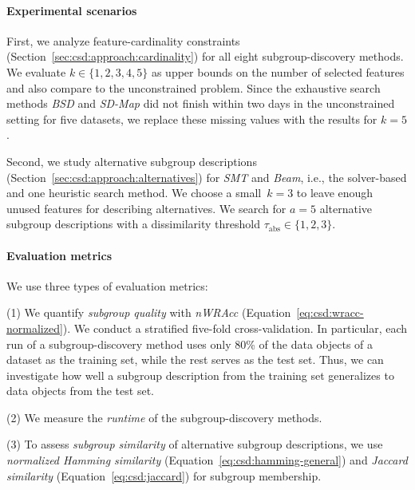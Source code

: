 \documentclass[acmsmall]{acmart} %
\theoremstyle{acmplain}
\theoremstyle{acmdefinition}
\begin{document}
\paragraph{Experimental scenarios}

First, we analyze feature-cardinality constraints (Section~\ref{sec:csd:approach:cardinality}) for all eight subgroup-discovery methods.
We evaluate $k \in \{1, 2, 3, 4, 5\}$ as upper bounds on the number of selected features and also compare to the unconstrained problem.
Since the exhaustive search methods \emph{BSD} and \emph{SD-Map} did not finish within two days in the unconstrained setting for five datasets, we replace these missing values with the results for $k=5$.

Second, we study alternative subgroup descriptions (Section~\ref{sec:csd:approach:alternatives}) for \emph{SMT} and \emph{Beam}, i.e., the solver-based and one heuristic search method.
We choose a small~$k=3$ to leave enough unused features for describing alternatives.
We search for $a=5$ alternative subgroup descriptions with a dissimilarity threshold $\tau_{\text{abs}} \in \{1, 2, 3\}$.

\paragraph{Evaluation metrics}

We use three types of evaluation metrics:

(1) We quantify \emph{subgroup quality} with \emph{nWRAcc} (Equation~\ref{eq:csd:wracc-normalized}).
We conduct a stratified five-fold cross-validation.
In particular, each run of a subgroup-discovery method uses only 80\% of the data objects of a dataset as the training set, while the rest serves as the test set.
Thus, we can investigate how well a subgroup description from the training set generalizes to data objects from the test set.

(2) We measure the \emph{runtime} of the subgroup-discovery methods.

(3) To assess \emph{subgroup similarity} of alternative subgroup descriptions, we use \emph{normalized Hamming similarity} (Equation~\ref{eq:csd:hamming-general}) and \emph{Jaccard similarity} (Equation~\ref{eq:csd:jaccard}) for subgroup membership.
\end{document}
